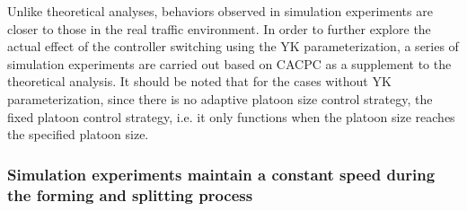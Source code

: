 \documentclass[journal]{IEEEtran}
\begin{document}
Unlike theoretical analyses, behaviors observed in simulation experiments are closer to those in the real traffic environment. In order to further explore the actual effect of the controller switching using the YK parameterization, a series of simulation experiments are carried out based on CACPC as a supplement to the theoretical analysis. It should be noted that for the cases without YK parameterization, since there is no adaptive platoon size control strategy, the fixed platoon control strategy, i.e. it only functions when the platoon size reaches the specified platoon size.

\subsubsection{Simulation experiments maintain a constant speed during the forming and splitting process}
\label{Section 5.2.1}

~\\
\end{document}
